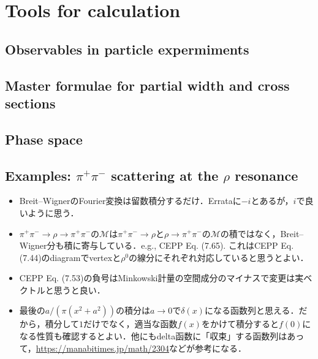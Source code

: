 \section{Tools for calculation}
\subsection{Observables in particle expermiments}
\subsection{Master formulae for partial width and cross sections}
\subsection{Phase space}
\subsection{Examples: $\pi^{+}\pi^{-}$ scattering at the $\rho $ resonance}
\begin{itemize}
		\item Breit--WignerのFourier変換は留数積分するだけ．Errataに$-i $とあるが，$i $で良いように思う．
		\item $\pi^{+}\pi^{-}\to \rho\to \pi^{+}\pi^{-} $の$\mathcal{M} $は$\pi^{+}\pi^{-}\to \rho$と$\rho\to \pi^{+}\pi^{-}  $の$\mathcal{M} $の積ではなく，Breit--Wigner分も積に寄与している．e.g., CEPP Eq. (7.65). これはCEPP Eq. (7.44)のdiagramでvertexと$\rho^0 $の線分にそれぞれ対応していると思うとよい．
		\item CEPP Eq. (7.53)の負号はMinkowski計量の空間成分のマイナスで変更は実ベクトルと思うと良い．
		\item 最後の$a/(\pi(x^2+a^2)) $の積分は$a\to 0 $で$\delta(x) $になる函数列と思える．だから，積分して$1 $だけでなく，適当な函数$f(x) $をかけて積分すると$f(0) $になる性質も確認するとよい．他にもdelta函数に「収束」する函数列はあって，\url{https://manabitimes.jp/math/2304}などが参考になる．
\end{itemize}
